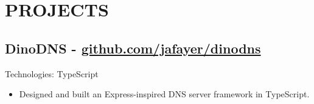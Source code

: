 \documentclass[letterpaper,10pt]{article}
\begin{document}
\section*{PROJECTS}

\subsection*{DinoDNS - \href{https://github.com/jafayer/dinodns}{\small{github.com/jafayer/dinodns}}}
\noindent Technologies: TypeScript \\

\begin{itemize}
    \item Designed and built an Express-inspired DNS server framework in TypeScript.
\end{itemize}




\end{document}
